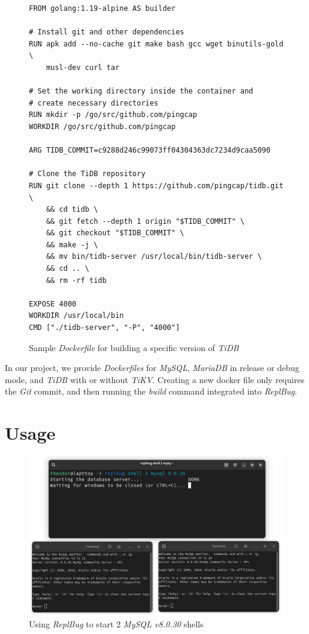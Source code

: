 \begin{figure}
\begin{verbatim}
FROM golang:1.19-alpine AS builder

# Install git and other dependencies
RUN apk add --no-cache git make bash gcc wget binutils-gold \
    musl-dev curl tar

# Set the working directory inside the container and
# create necessary directories
RUN mkdir -p /go/src/github.com/pingcap
WORKDIR /go/src/github.com/pingcap

ARG TIDB_COMMIT=c9288d246c99073ff04304363dc7234d9caa5090

# Clone the TiDB repository
RUN git clone --depth 1 https://github.com/pingcap/tidb.git \
    && cd tidb \
    && git fetch --depth 1 origin "$TIDB_COMMIT" \
    && git checkout "$TIDB_COMMIT" \
    && make -j \
    && mv bin/tidb-server /usr/local/bin/tidb-server \
    && cd .. \
    && rm -rf tidb

EXPOSE 4000
WORKDIR /usr/local/bin
CMD ["./tidb-server", "-P", "4000"]    
\end{verbatim}
\caption{Sample \textit{Dockerfile} for building a specific version of \textit{TiDB}}
\label{fig:dockerfilesample}
\end{figure}

In our project, we provide \textit{Dockerfiles} for \textit{MySQL}, \textit{MariaDB} in release or debug mode, and \textit{TiDB} with or without \textit{TiKV}. Creating a new docker file only requires the \textit{Git} commit, and then running the \textit{build} command integrated into \textit{ReplBug}. 

\section{Usage}



\begin{figure}
    \centering
    \includegraphics[width=\linewidth]{assets/replbug_shell.png}
    \caption{Using \textit{ReplBug} to start 2 \textit{MySQL v8.0.30} shells}
    \label{fig:replb_shell}
\end{figure}

